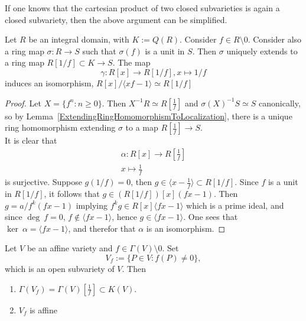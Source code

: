     \begin{remark}
        If one knows that the cartesian product of two closed subvarieties is again a closed subvariety, then the above argument can be simplified.  
    \end{remark}
    \begin{lemma}\label{ImportantIsomorphismForOpenAffineVarieties}
        Let $R$ be an integral domain, with $K:=Q(R)$. Consider $f\in R\setminus 0$. Consider also a ring map $\sigma : R\rightarrow S$ such that $\sigma(f)$ is a unit in $S$. Then $\sigma$ uniquely extends to a ring map $R[1/f]\subset K \rightarrow S$. The map 
        $$\gamma : R[x] \rightarrow R[1/f], x\mapsto 1/f$$
        induces an isomorphism, $R[x]/\langle xf-1\rangle\simeq R[1/f]$
    \end{lemma}
    \begin{proof}
        Let $X=\{ f^n : n\geq 0\}$. Then $X^{-1}R\simeq R\left[\frac{1}{f}\right]$ and $\sigma(X)^{-1}S\simeq S$ canonically, so by Lemma~\ref{ExtendingRingHomomorphismToLocalization}, there is a unique ring homomorphism extending $\sigma$ to a map $R\left[\frac{1}{f}\right] \rightarrow S$.\\
        It is clear that 
        \begin{gather*}
            \alpha: R[x] \rightarrow R\left[\frac{1}{f}\right]\\
            x\mapsto \frac{1}{f}
        \end{gather*}
        is surjective. Suppose $g(1/f)=0$, then $g\in \langle x-\frac{1}{f}\rangle\subset R[1/f]$. Since $f$ is a unit in $R[1/f]$, it follows that $g\in (R[1/f])[x](fx-1)$. Then $g=a/f^k(fx-1)$ implying $f^kg\in R[x]\langle fx-1\rangle$ which is a prime ideal, and since $\deg \ f =0$, $f\notin \langle fx-1\rangle$, hence $g\in \langle fx-1\rangle$. One sees that $\ker \ \alpha = \langle fx-1\rangle$, and therefor that $\alpha$ is an isomorphism.
    \end{proof}
    \begin{proposition}\label{ConstructionOfAffineNeighborhood}
        Let $V$ be an affine variety and $f\in \Gamma(V)\setminus 0$. Set 
        $$V_f:= \{P\in V: f(P)\neq 0\},$$
        which is an open subvariety of $V$. Then 
        \begin{enumerate}
            \item $\Gamma(V_f)=\Gamma(V)\left[\frac{1}{f}\right] \subset K(V)$.
            \item $V_f$ is affine
        \end{enumerate}
    \end{proposition}
